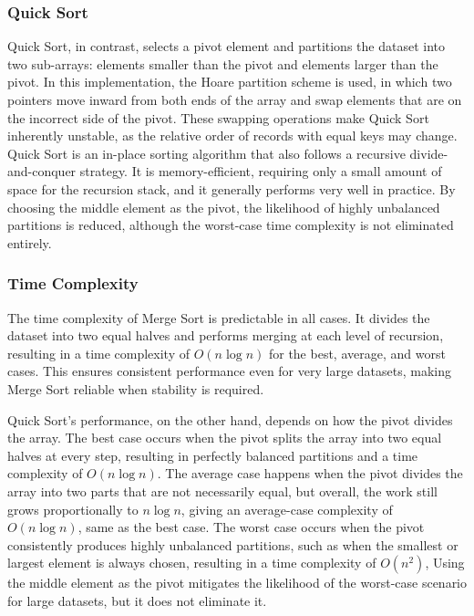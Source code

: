 \documentclass[12pt]{article}
\begin{document}
\subsubsection{Quick Sort}

Quick Sort, in contrast, selects a pivot element and partitions the dataset into two sub-arrays:
elements smaller than the pivot and elements larger than the pivot. In this implementation, the
Hoare partition scheme is used, in which two pointers move inward from both ends of the array
and swap elements that are on the incorrect side of the pivot\parencite{opengenus_hoare_partition,roy2024lomuto_vs_hoare_medium}. These swapping operations make
Quick Sort inherently unstable, as the relative order of records with equal keys may change\parencite{rizvi2024sorting_algorithms_in_focus,roy2024lomuto_vs_hoare_medium}.
Quick Sort is an in-place sorting algorithm that also follows a recursive divide-and-conquer
strategy. It is memory-efficient, requiring only a small amount of space for the recursion stack,
and it generally performs very well in practice. By choosing the middle element as the pivot, the
likelihood of highly unbalanced partitions is reduced, although the worst-case time complexity is
not eliminated entirely.

\subsubsection{Time Complexity}

The time complexity of Merge Sort is predictable in all cases. It divides the dataset into two
equal halves and performs merging at each level of recursion, resulting in a time complexity of $O(n \log n)$ for the best, average, and worst cases\parencite{rizvi2024sorting_algorithms_in_focus}. This ensures consistent performance even for
very large datasets, making Merge Sort reliable when stability is required.

Quick Sort’s performance, on the other hand, depends on how the pivot divides the array. The
best case occurs when the pivot splits the array into two equal halves at every step, resulting in
perfectly balanced partitions and a time complexity of $O(n \log n)$. The average case happens
when the pivot divides the array into two parts that are not necessarily equal, but overall, the work
still grows proportionally to $n \log n$, giving an average-case complexity of $O(n \log n)$, same as
the best case. The worst case occurs when the pivot consistently produces highly unbalanced
partitions, such as when the smallest or largest element is always chosen, resulting in a time
complexity of $O(n^{2})$\parencite{rizvi2024sorting_algorithms_in_focus,roy2024lomuto_vs_hoare_medium}, Using the middle element as the pivot mitigates the likelihood of the
worst-case scenario for large datasets, but it does not eliminate it.
\end{document}

